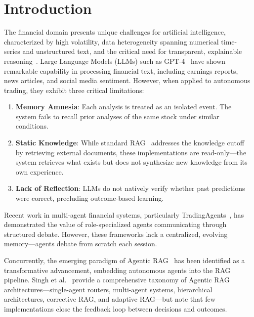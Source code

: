 \documentclass[conference]{IEEEtran}
\begin{document}
\section{Introduction}

The financial domain presents unique challenges for artificial intelligence, characterized by high volatility, data heterogeneity spanning numerical time-series and unstructured text, and the critical need for transparent, explainable reasoning~\cite{minaee2024llm}. Large Language Models (LLMs) such as GPT-4~\cite{openai2023gpt4} have shown remarkable capability in processing financial text, including earnings reports, news articles, and social media sentiment. However, when applied to autonomous trading, they exhibit three critical limitations:

\begin{enumerate}
\item \textbf{Memory Amnesia}: Each analysis is treated as an isolated event. The system fails to recall prior analyses of the same stock under similar conditions.
\item \textbf{Static Knowledge}: While standard RAG~\cite{lewis2020rag} addresses the knowledge cutoff by retrieving external documents, these implementations are read-only---the system retrieves what exists but does not synthesize new knowledge from its own experience.
\item \textbf{Lack of Reflection}: LLMs do not natively verify whether past predictions were correct, precluding outcome-based learning.
\end{enumerate}

Recent work in multi-agent financial systems, particularly TradingAgents~\cite{tradingagents2024}, has demonstrated the value of role-specialized agents communicating through structured debate. However, these frameworks lack a centralized, evolving memory---agents debate from scratch each session.

Concurrently, the emerging paradigm of Agentic RAG~\cite{singh2025agenticrag} has been identified as a transformative advancement, embedding autonomous agents into the RAG pipeline. Singh et al.~\cite{singh2025agenticrag} provide a comprehensive taxonomy of Agentic RAG architectures---single-agent routers, multi-agent systems, hierarchical architectures, corrective RAG, and adaptive RAG---but note that few implementations close the feedback loop between decisions and outcomes.
\end{document}
